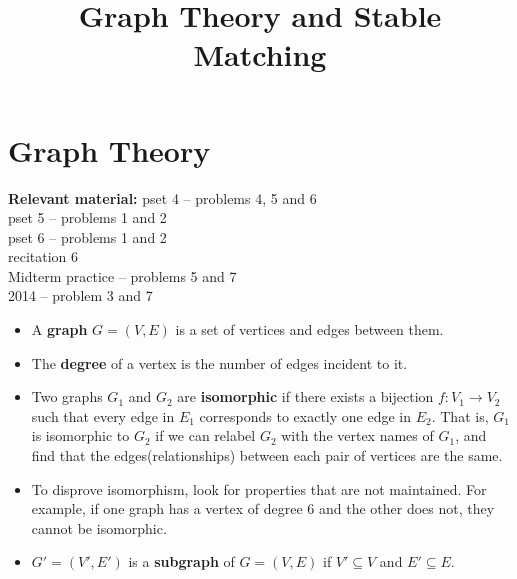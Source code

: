 \documentclass[11pt]{article}
\title{Graph Theory and Stable Matching}
\begin{document}
\maketitle

\section{Graph Theory}
\textbf{Relevant material: }
pset 4 -- problems 4, 5 and 6\\
 pset 5 -- problems 1 and 2\\
 pset 6 -- problems 1 and 2\\
   recitation 6\\
   Midterm practice -- problems 5 and 7\\
  2014 -- problem 3 and 7

\begin{itemize}
	\item A \textbf{graph} $G = (V, E)$ is a set of vertices and edges between them.
	\item The \textbf{degree} of a vertex is the number of edges incident to it.
	\item Two graphs $G_1$ and $G_2$ are \textbf{isomorphic} if there exists a bijection
	$f: V_1 \rightarrow V_2$ such that every edge in $E_1$ corresponds to exactly one
	edge in $E_2$.  That is, $G_1$ is isomorphic to $G_2$ if we can relabel $G_2$ with
	the vertex names of $G_1$, and find that the edges(relationships) between each pair
	of vertices are the same. 
	\item To disprove isomorphism, look for properties that are not maintained.  For example, if one graph has a vertex of degree $6$ and the other does not, they cannot
	be isomorphic.
	\item $G' = (V', E')$ is a \textbf{subgraph} of $G = (V, E)$ if $V' \subseteq V$ and
	$E' \subseteq E$. 
	

\end{itemize}
\end{document}
